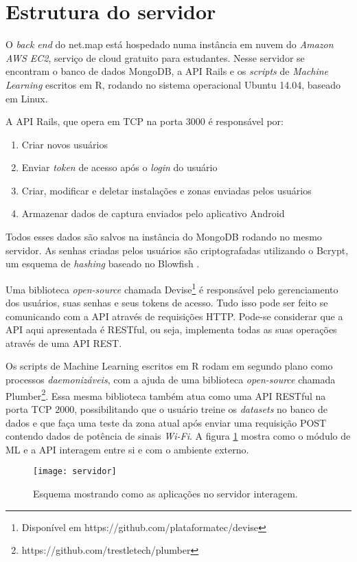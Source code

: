 \section{Estrutura do servidor}
O \textit{back end} do net.map está hospedado numa instância em nuvem do \textit{Amazon AWS EC2}, serviço de cloud gratuito para estudantes. Nesse servidor se encontram o banco de dados MongoDB, a API Rails e os \textit{scripts} de \textit{Machine Learning} escritos em R, rodando no sistema operacional Ubuntu 14.04, baseado em Linux.
\par
A API Rails, que opera em TCP na porta 3000 é responsável por:
\begin{enumerate}
\item Criar novos usuários
\item Enviar \textit{token} de acesso após o \textit{login} do usuário
\item Criar, modificar e deletar instalações e zonas enviadas pelos usuários
\item Armazenar dados de captura enviados pelo aplicativo Android
\end{enumerate} 

Todos esses dados são salvos na instância do MongoDB rodando no mesmo servidor. As senhas criadas pelos usuários são criptografadas utilizando o Bcrypt, um esquema de \textit{hashing} baseado no Blowfish \cite{provos1999bcrypt}.
\par
Uma biblioteca \textit{open-source} chamada Devise\footnote{Disponível em https://github.com/plataformatec/devise} é responsável pelo gerenciamento dos usuários, suas senhas e seus tokens de acesso. Tudo isso pode ser feito se comunicando com a API através de requisições HTTP. Pode-se considerar que a API aqui apresentada é RESTful, ou seja, implementa todas as suas operações através de uma API REST.
\par
Os scripts de Machine Learning escritos em R rodam em segundo plano como processos \textit{daemonizáveis}, com a ajuda de uma biblioteca \textit{open-source} chamada Plumber\footnote{https://github.com/trestletech/plumber}. Essa mesma biblioteca também atua como uma API RESTful na porta TCP 2000, possibilitando que o usuário treine os \textit{datasets} no banco de dados e que faça uma teste da zona atual após enviar uma requisição POST contendo dados de potência de sinais \textit{Wi-Fi}. A figura \ref{fig:servidor} mostra como o módulo de ML e a API interagem entre si e com o ambiente externo.


\begin{figure}[H]
	\centering
	\caption{Esquema mostrando como as aplicações no servidor interagem.}
  \texttt{[image: servidor]}
\label{fig:servidor}

\end{figure}



